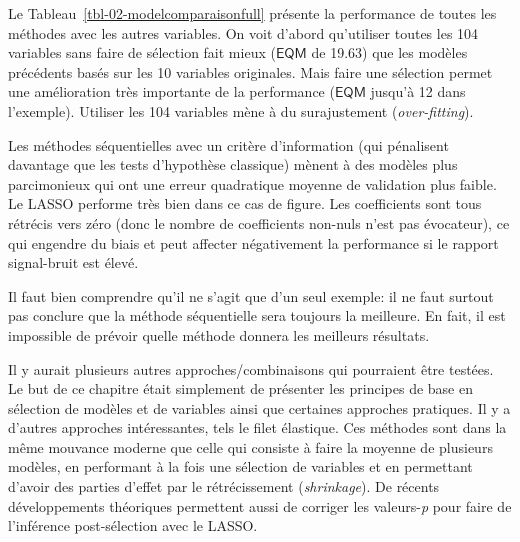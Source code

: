 \documentclass[
  11pt,
  letterpaper,
]{scrbook}
\theoremstyle{definition}
\theoremstyle{remark}
\begin{document}
Le Tableau~\ref{tbl-02-modelcomparaisonfull} présente la performance de
toutes les méthodes avec les autres variables. On voit d'abord
qu'utiliser toutes les 104 variables sans faire de sélection fait mieux
(\(\mathsf{EQM}\) de 19.63) que les modèles précédents basés sur les 10
variables originales. Mais faire une sélection permet une amélioration
très importante de la performance (\(\mathsf{EQM}\) jusqu'à 12 dans
l'exemple). Utiliser les 104 variables mène à du surajustement
(\emph{over-fitting}).

Les méthodes séquentielles avec un critère d'information (qui pénalisent
davantage que les tests d'hypothèse classique) mènent à des modèles plus
parcimonieux qui ont une erreur quadratique moyenne de validation plus
faible. Le LASSO performe très bien dans ce cas de figure. Les
coefficients sont tous rétrécis vers zéro (donc le nombre de
coefficients non-nuls n'est pas évocateur), ce qui engendre du biais et
peut affecter négativement la performance si le rapport signal-bruit est
élevé.

Il faut bien comprendre qu'il ne s'agit que d'un seul exemple: il ne
faut surtout pas conclure que la méthode séquentielle sera toujours la
meilleure. En fait, il est impossible de prévoir quelle méthode donnera
les meilleurs résultats.

Il y aurait plusieurs autres approches/combinaisons qui pourraient être
testées. Le but de ce chapitre était simplement de présenter les
principes de base en sélection de modèles et de variables ainsi que
certaines approches pratiques. Il y a d'autres approches intéressantes,
tels le filet élastique. Ces méthodes sont dans la même mouvance moderne
que celle qui consiste à faire la moyenne de plusieurs modèles, en
performant à la fois une sélection de variables et en permettant d'avoir
des parties d'effet par le rétrécissement (\emph{shrinkage}). De récents
développements théoriques permettent aussi de corriger les
valeurs-\emph{p} pour faire de l'inférence post-sélection avec le LASSO.
\end{document}
